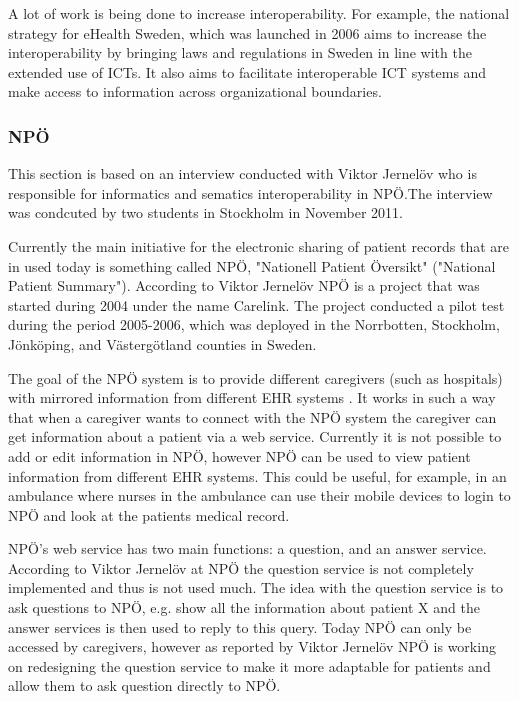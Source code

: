 \documentclass[14pt]{article}
\begin{document}

A lot of work is being done to increase \gls{interoperability}. For example, the national strategy for eHealth Sweden, which was launched in 2006 aims to increase the interoperability by bringing laws and regulations in Sweden in line with the extended use of \glspl{ICT}. It also aims to facilitate interoperable \gls{ICT} systems and make access to information across organizational boundaries. \cite{NationalStrategy} 

\subsubsection{NPÖ} %
\label{sec:npoInterv}
This section is based on an interview conducted with Viktor Jernelöv who is responsible for informatics and sematics interoperability in NPÖ.The interview was condcuted by two students in Stockholm in November 2011. 

Currently the main initiative for the electronic sharing of patient records that are in used today is something called NPÖ, "Nationell Patient Översikt" ("National Patient Summary"). According to Viktor Jernelöv \cite {ViktorJernelov} NPÖ is a project that was started during 2004 under the name Carelink. The project conducted a pilot test during the period 2005-2006, which was deployed in the Norrbotten, Stockholm, Jönköping, and Västergötland counties in Sweden.

The goal of the NPÖ system is to provide different caregivers (such as hospitals) with mirrored information from different EHR systems \cite{ViktorJernelov}. It works in such a way that when a caregiver wants to connect with the NPÖ system the caregiver can get information about a patient via a web service. Currently it is not possible to add or edit information in NPÖ, however NPÖ can be used to view patient information from different EHR systems. This could be useful, for example, in an ambulance where nurses in the ambulance can use their mobile devices to login to NPÖ and look at the patients medical record.  

NPÖ's web service has two main functions: a question, and an answer service. According to Viktor Jernelöv at NPÖ \cite{ViktorJernelov} the question service is not completely implemented and thus is not used much. The idea with the question service is to ask questions to NPÖ, e.g. show all the information about patient X and the answer services is then used to reply to this query. Today NPÖ can only be accessed by caregivers, however as reported by Viktor Jernelöv \cite{ViktorJernelov} NPÖ is working on redesigning the question service to make it more adaptable for patients and allow them to ask question directly to NPÖ.
\end{document}
